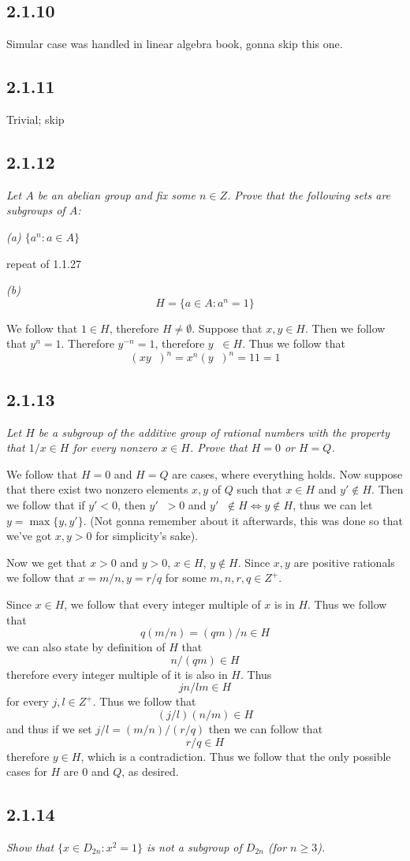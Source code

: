 \documentclass[11pt,oneside,titlepage]{book}
\DeclareMathOperator \inv {^{-1}}
\begin{document}
\subsection*{2.1.10}

Simular case was handled in linear algebra book, gonna skip this one.

\subsection*{2.1.11}

Trivial; skip

\subsection*{2.1.12}

\textit{Let $A$ be an abelian group and fix some $n \in Z$. Prove that the following sets are
  subgroups of $A$:}

\textit{(a) $\{a^n: a \in A\}$}

repeat of 1.1.27

\textit{(b) $$H = \{a \in A: a^n = 1\}$$}

We follow that $1 \in H$, therefore $H \neq \emptyset$. Suppose that $x, y \in H$. Then we
follow that $y^n = 1$. Therefore $y^{-n} = 1$, therefore $y\inv \in H$.
Thus we follow that
$$(xy\inv)^n = x^n (y\inv)^n = 11 = 1$$


\subsection*{2.1.13}

\textit{Let $H$ be a subgroup of the additive group of rational numbers with the property
  that $1/x \in H$ for every nonzero $x \in H$. Prove that $H = 0$ or $H = Q$.}

We follow that $H = 0$ and $H = Q$ are cases, where everything holds. Now suppose that
there exist two nonzero elements $x, y$ of $Q$ such that $x \in H$ and $y' \notin H$.
Then we follow that if $y' < 0$, then $y'\inv > 0$ and $y'\inv \notin H \iff y \notin H$,
thus we can let $y = \max\{y, y'\}$. (Not gonna remember about it afterwards, this was
done so that we've got $x, y > 0$ for simplicity's sake).

Now we get that $x > 0$ and $y > 0$, $x \in H$, $y \notin H$. Since $x, y$ are
positive rationals we follow that $x = m/n, y = r/q$ for some $m, n, r, q \in Z^+$.

Since $x \in H$, we follow that every integer multiple of $x$ is in $H$. Thus we follow that
$$q(m/n) = (qm)/n \in H$$
we can also state by definition of $H$ that
$$n/(qm) \in H$$
therefore every integer multiple of it is also in $H$. Thus
$$jn/lm \in H$$
for every $j, l \in Z^+$. Thus we follow that
$$(j/l)(n/m)  \in H$$
and thus if we set $j/l =  (m/n) / (r/q)$
then we can follow that
$$r/q \in H$$
therefore $y\in H$, which is a contradiction. Thus we follow that the only possible cases for
$H$ are $0$ and $Q$, as desired.

\subsection*{2.1.14}

\textit{Show that $\{x \in D_{2n}: x^2 = 1\}$ is not a subgroup of $D_{2n}$ (for $n \geq 3$).}
\end{document}
